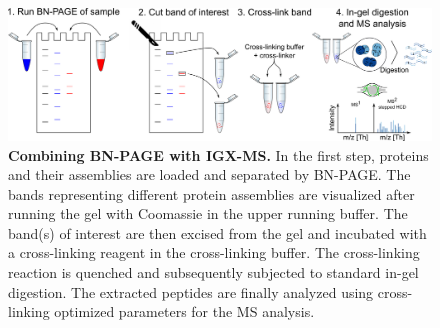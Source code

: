 \begin{figure}[htb]
	\center
	\includegraphics[]{Chapter.2/Figures/Figure1.png}
	\caption{\textbf{Combining BN-PAGE with IGX-MS.} In the first step, proteins and their assemblies are loaded and separated by BN-PAGE. The bands representing different protein assemblies are visualized after running the gel with Coomassie in the upper running buffer. The band(s) of interest are then excised from the gel and incubated with a cross-linking reagent in the cross-linking buffer. The cross-linking reaction is quenched and subsequently subjected to standard in-gel digestion. The extracted peptides are finally analyzed using cross-linking optimized parameters for the MS analysis.}
	\label{fig:ch2_fig1}
\end{figure}
